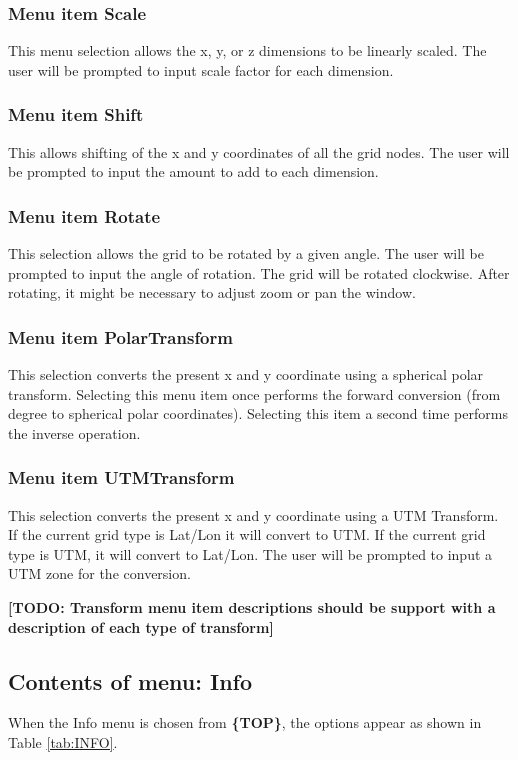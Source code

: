 \documentclass{article}
\begin{document}
\subsubsection{Menu item Scale}
This menu selection allows the x, y, or z dimensions to be linearly scaled. The user will be prompted to input scale factor for each dimension. 

\subsubsection[Menu item Shift]{Menu item Shift}
This allows shifting of the x and y coordinates of all the grid nodes. The user will be prompted to input the amount to add to each dimension.

\subsubsection{Menu item Rotate}
This selection allows the grid to be rotated by a given angle. The user will be prompted to input the angle of rotation. The grid will be rotated clockwise. After rotating, it might be necessary to adjust zoom or pan the window. 

\subsubsection{Menu item PolarTransform}
This selection converts the present x and y coordinate using a spherical polar transform.  Selecting this menu item once performs the forward conversion (from degree to spherical polar coordinates).  Selecting this item a second time performs the inverse operation.

\subsubsection{Menu item UTMTransform}
This selection converts the present x and y coordinate using a UTM Transform. If the current grid type is Lat/Lon it will convert to UTM. If the current grid type is UTM, it will convert to Lat/Lon. The user will be prompted to input a UTM zone for the conversion.

\textbf{[TODO: Transform menu item descriptions should be support with a description of each type of transform]}


\subsection{Contents of menu: Info}
When the Info menu is chosen from \textbf{\{TOP\}}, the options appear as shown in Table \ref{tab:INFO}.
\end{document}
